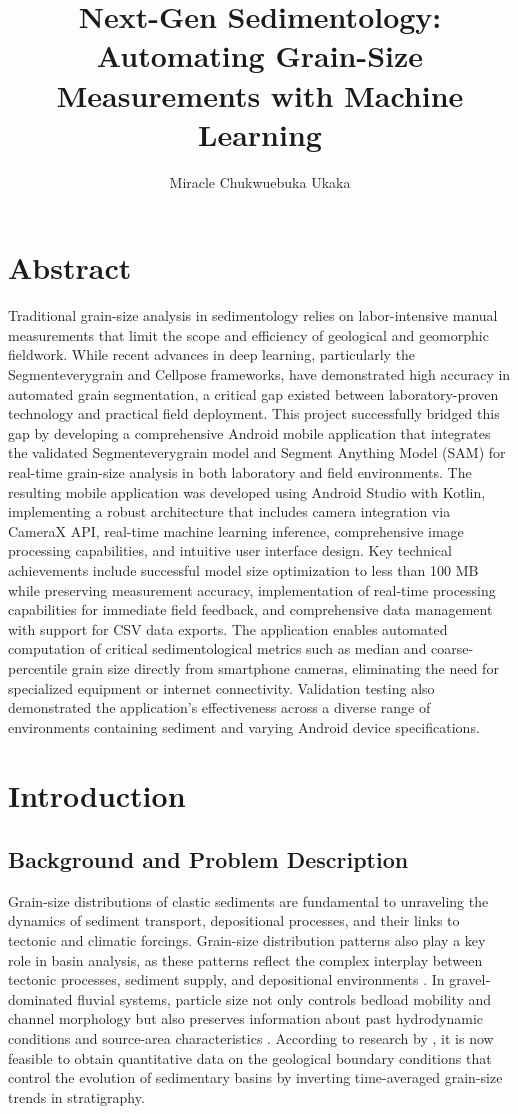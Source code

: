 \documentclass[final-report]{report-template}
\title{Next-Gen Sedimentology: Automating Grain-Size Measurements with Machine Learning}
\author{Miracle Chukwuebuka Ukaka}
\begin{document}
\maketitlepage  %

\tableofcontents
\newpage

\section{Abstract}
Traditional grain-size analysis in sedimentology relies on labor-intensive manual measurements that limit the scope and efficiency of geological and geomorphic fieldwork. While recent advances in deep learning, particularly the Segmenteverygrain and Cellpose frameworks, have demonstrated high accuracy in automated grain segmentation, a critical gap existed between laboratory-proven technology and practical field deployment. This project successfully bridged this gap by developing a comprehensive Android mobile application that integrates the validated Segmenteverygrain model and Segment Anything Model (SAM) for real-time grain-size analysis in both laboratory and field environments. The resulting mobile application was developed using Android Studio with Kotlin, implementing a robust architecture that includes camera integration via CameraX API, real-time machine learning inference, comprehensive image processing capabilities, and intuitive user interface design. Key technical achievements include successful model size optimization to less than 100 MB while preserving measurement accuracy, implementation of real-time processing capabilities for immediate field feedback, and comprehensive data management with support for CSV data exports. The application enables automated computation of critical sedimentological metrics such as median and coarse-percentile grain size directly from smartphone cameras, eliminating the need for specialized equipment or internet connectivity. Validation testing also demonstrated the application's effectiveness across a diverse range of environments containing sediment and varying Android device specifications. 


\section{Introduction}
\subsection{Background and Problem Description}
Grain-size distributions of clastic sediments are fundamental to unraveling the dynamics of sediment transport, depositional processes, and their links to tectonic and climatic forcings. Grain-size distribution patterns also play a key role in basin analysis, as these patterns reflect the complex interplay between tectonic processes, sediment supply, and depositional environments \citep{allen2005basin}. In gravel‐dominated fluvial systems, particle size not only controls bedload mobility and channel morphology but also preserves information about past hydrodynamic conditions and source-area characteristics \citep{Church2006}. According to research by \cite{Alexander2011}, it is now feasible to obtain quantitative data on the geological boundary conditions that control the evolution of sedimentary basins by inverting time-averaged grain-size trends in stratigraphy. 
\end{document}
